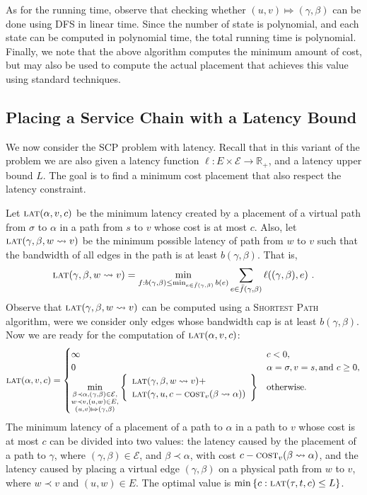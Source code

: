 \documentclass[11pt]{article}
\newcommand{\set}[1]{\left\{ #1 \right\}}
\newcommand{\reals}{\mathbb{R}}
\newcommand{\scp}{\textsc{SCP}\xspace}
\newcommand{\calE}{\mathcal{E}}
\newcommand{\cost}{\textsc{cost}\xspace}
\newcommand{\latency}{\textsc{lat}\xspace}
\begin{document}
As for the running time, observe that checking whether $(u, v) \Mapsto
(\gamma,\beta)$ can be done using DFS in linear time.
%
Since the number of state is polynomial, and each state can be
computed in polynomial time, the total running time is polynomial.
Finally, we note that the above algorithm computes the minimum amount
of cost, but may also be used to compute the actual placement
that achieves this value using standard techniques.


\subsection{Placing a Service Chain with a Latency Bound}
\label{sub:DPL}

We now consider the \scp problem with latency.  Recall that in this
variant of the problem we are also given a latency function $\ell: E
\times \calE \to \reals_+$, and a latency upper bound $L$.  The goal
is to find a minimum cost placement that also respect the latency
constraint.

Let $\latency(\alpha,v,c)$ be the minimum latency created by a
placement of a virtual path from $\sigma$ to $\alpha$ in a path from
$s$ to $v$ whose cost is at most $c$.
%
Also, let $\latency(\gamma,\beta,w \leadsto v)$ be the minimum
possible latency of path from $w$ to $v$ such that the bandwidth of
all edges in the path is at least $b(\gamma,\beta)$.  That is,
\[ 
\latency(\gamma,\beta,w \leadsto v)
= \min_{f: b(\gamma,\beta) \leq \min_{e \in \bar{f}(\gamma,\beta)} b(e)}
    \sum_{e \in \bar{f}(\gamma,\beta)} \ell((\gamma,\beta),e)
~.
\]
Observe that $\latency(\gamma,\beta,w \leadsto v)$ can be computed
using a \textsc{Shortest Path} algorithm, were we consider only edges
whose bandwidth cap is at least $b(\gamma,\beta)$.
%
Now we are ready for the computation of $\latency(\alpha,v,c)$:
\[
\latency(\alpha,v,c) =
\begin{cases}
\infty  &  c < 0,\\
0       & \alpha = \sigma, v = s, \text{and } c \geq 0, \\
\displaystyle
\min_{
  \substack{\beta \prec \alpha, (\gamma,\beta) \in \calE, \\
           w \prec v, (u,w) \in E, \\
         (u,v) \Mapsto (\gamma,\beta)}
     }
     \set{\begin{array}{l}
          \latency(\gamma,\beta,w \leadsto v) + \\
          \latency(\gamma,u,c - \cost_v(\beta \leadsto \alpha))
          \end{array}
     }
  & \text{otherwise}.
\end{cases}
\]
The minimum latency of a placement of a path to $\alpha$ in a path to
$v$ whose cost is at most $c$ can be divided into two values: the
latency caused by the placement of a path to $\gamma$, where
$(\gamma,\beta) \in \calE$, and $\beta \prec \alpha$, with cost $c -
\cost_v(\beta \leadsto \alpha)$, and the latency caused by placing a
virtual edge $(\gamma,\beta)$ on a physical path from $w$ to $v$,
where $w \prec v$ and $(u,w) \in E$.
%
The optimal value is $\min \set{c : \latency(\tau,t,c) \leq L}$.
\end{document}
